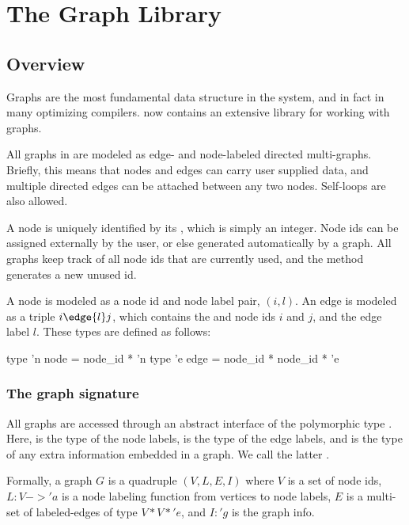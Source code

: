 \section{The Graph Library}

\subsection{Overview}

Graphs are the most fundamental data structure in the \MLRISC{} system,
and in fact in many optimizing compilers.
\MLRISC{} now contains an extensive library for working with graphs.

All graphs in \MLRISC{} 
are modeled as edge- and node-labeled directed multi-graphs.
Briefly, this means that nodes and edges can carry user supplied data, and  
multiple directed edges can be attached between any two nodes.
Self-loops are also allowed.

A node is uniquely identified by its , which is
simply an integer.  Node ids can be assigned externally 
by the user, or else generated automatically by a graph.  All graphs
keep track of all node ids that are currently used,
and the method  generates a new unused id.

A node is modeled as a node id and node label pair, $(i,l)$.
An edge is modeled as a triple $i \edge{l} j$, which contains
the  and  node ids $i$ and $j$,
and the edge label $l$.  These types are defined as follows:
\begin{SML}
   type 'n node = node_id * 'n 
   type 'e edge = node_id * node_id * 'e
\end{SML}

\subsubsection{The graph signature}

All graphs are accessed through an abstract interface
of the polymorphic type .
Here,  is the type of the node labels,  is the type
of the edge labels, and  is the type of any extra information
embedded in a graph.  We call the latter .

Formally, a graph $G$ is a quadruple $(V,L,E,I)$
where $V$ is a set of node ids, $L : V -> 'a$ is a node labeling
function from vertices to node labels, $E$ is a multi-set
of labeled-edges of type $V * V * 'e$, and $I: 'g$
is the graph info.

